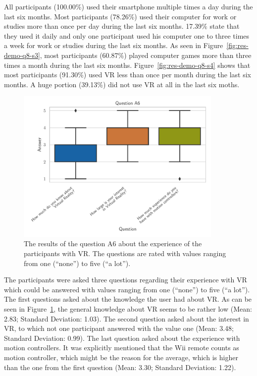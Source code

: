 All participants (100.00\%) used their smartphone multiple times a day during the last six months. Most participants (78.26\%) used their computer for work or studies more than once per day during the last six months. 17.39\% state that they used it daily and only one participant used his computer one to three times a week for work or studies during the last six months. As seen in Figure~\ref{fig:res-demo-q8-s3}, most participants (60.87\%) played computer games more than three times a month during the last six months. Figure~\ref{fig:res-demo-q8-s4} shows that most participants (91.30\%) used \ac{VR} less than once per month during the last six months. A huge portion (39.13\%) did not use \ac{VR} at all in the last six moths.

\begin{figure}[H]
  \centering
  \includegraphics[width=10cm]{figures/evaluation/res_demo_q9.pdf}
  \caption[VR experience of the participants]{The results of the question A6 about the experience of the participants with \ac{VR}. The questions are rated with values ranging from one (\enquote{none}) to five (\enquote{a lot}).}\label{fig:res-demo-q9}
\end{figure}

The participants were asked three questions regarding their experience with \ac{VR} which could be answered with values ranging from one (\enquote{none}) to five (\enquote{a lot}). The first questions asked about the knowledge the user had about \ac{VR}. As can be seen in Figure~\ref{fig:res-demo-q9}, the general knowledge about \ac{VR} seems to be rather low (Mean: 2.83; Standard Deviation: 1.03). The second question asked about the interest in \ac{VR}, to which not one participant answered with the value one (Mean: 3.48; Standard Deviation: 0.99). The last question asked about the experience with motion controllers. It was explicitly mentioned that the Wii remote counts as motion controller, which might be the reason for the average, which is higher than the one from the first question (Mean: 3.30; Standard Deviation: 1.22).


